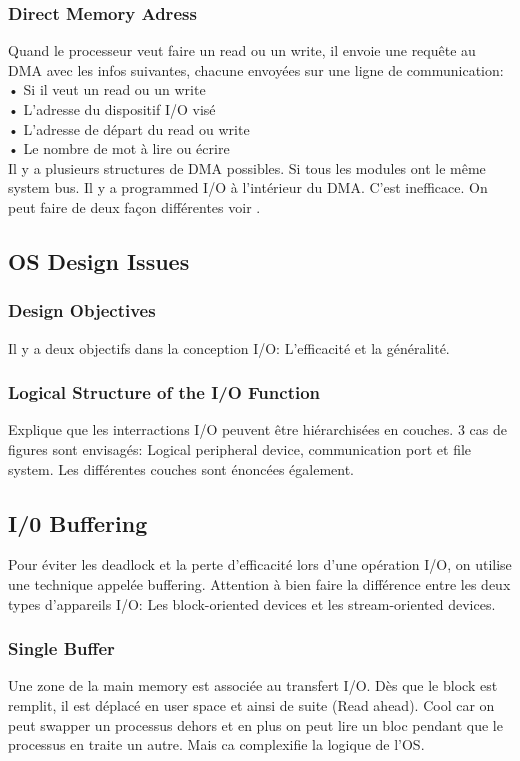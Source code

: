 \subsubsection{Direct Memory Adress}
Quand le processeur veut faire un read ou un write, il envoie une requête au DMA avec les infos suivantes, chacune envoyées sur une ligne de communication: \\
• Si il veut un read ou un write \\
• L'adresse du dispositif I/O visé \\
• L'adresse de départ du read ou write \\
• Le nombre de mot à lire ou écrire \\
Il y a plusieurs structures de DMA possibles.
Si tous les modules ont le même system bus.
Il y a programmed I/O à l'intérieur du DMA.
C'est inefficace.
On peut faire de deux façon différentes voir \cite[p.~500]{stallings}.

\subsection{OS Design Issues}

\subsubsection{Design Objectives}
Il y a deux objectifs dans la conception I/O: L'efficacité et la généralité.

\subsubsection{Logical Structure of the I/O Function}
Explique que les interractions I/O peuvent être hiérarchisées en couches.
3 cas de figures sont envisagés: Logical peripheral device, communication port et file system.
Les différentes couches sont énoncées également.

\subsection{I/0 Buffering}
Pour éviter les deadlock et la perte d'efficacité lors d'une opération I/O, on utilise une technique appelée buffering.
Attention à bien faire la différence entre les deux types d'appareils I/O: Les block-oriented devices et les stream-oriented devices.

\subsubsection{Single Buffer}
Une zone de la main memory est associée au transfert I/O.
Dès que le block est remplit, il est déplacé en user space et ainsi de suite (Read ahead).
Cool car on peut swapper un processus dehors et en plus on peut lire un bloc pendant que le processus en traite un autre.
Mais ca complexifie la logique de l'OS.

